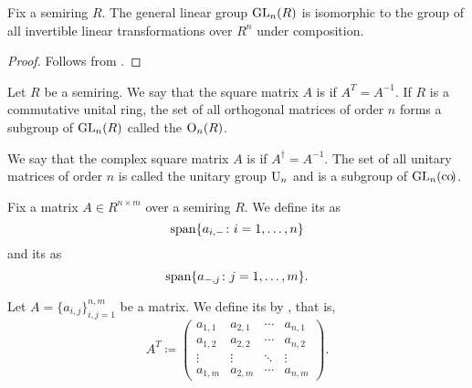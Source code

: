 \begin{proposition}\label{thm:general_linear_group_isomorphic_to_automorphism_group}
  Fix a semiring \( R \). The general linear group \( \operatorname{GL}_n(R) \) is isomorphic to the group of all invertible linear transformations over \( R^n \) under composition.
\end{proposition}
\begin{proof}
  Follows from .
\end{proof}

\begin{definition}\label{def:orthogonal_matrix}
  Let \( R \) be a semiring. We say that the square matrix \( A \) is  if \( A^T = A^{-1} \). If \( R \) is a commutative unital ring, the set of all orthogonal matrices of order \( n \) forms a subgroup of \( \operatorname{GL}_n(R) \) called the  \( \operatorname{O}_n(R) \).
\end{definition}

\begin{definition}\label{def:unitary_matrix}
  We say that the complex square matrix \( A \) is  if \( A^\dagger = A^{-1} \). The set of all unitary matrices of order \( n \) is called the unitary group \( \operatorname{U}_n \) and is a subgroup of \( \operatorname{GL}_n(\operatorname*{co\negthinspace)} \).
\end{definition}

\begin{definition}\label{def:matrix_column_and_row_space}
  Fix a matrix \( A \in R^{n \times m} \) over a semiring \( R \). We define its  as
  \begin{equation*}
    \operatorname{span} \{ a_{i,-} \colon i = 1, \ldots, n \}
  \end{equation*}
  and its  as
  \begin{equation*}
    \operatorname{span} \{ a_{-,j} \colon j = 1, \ldots, m \}.
  \end{equation*}
\end{definition}

\begin{definition}\label{def:matrix_transpose}
  Let \( A = \{ a_{i,j} \}_{i,j=1}^{n,m} \) be a matrix. We define its  by , that is,
  \begin{equation*}
    A^T \coloneqq \begin{pmatrix}
      a_{1,1} & a_{2,1} & \cdots & a_{n,1} \\
      a_{1,2} & a_{2,2} & \cdots & a_{n,2} \\
      \vdots  & \vdots  & \ddots & \vdots  \\
      a_{1,m} & a_{2,m} & \cdots & a_{n,m}
    \end{pmatrix}.
  \end{equation*}
\end{definition}

